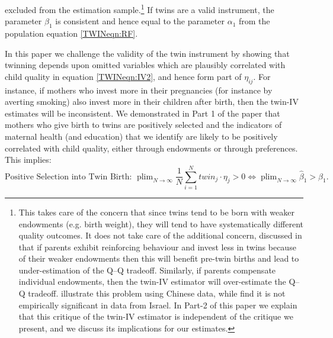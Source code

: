 \documentclass[subeqn]{article}
\DeclareMathOperator{\plim}{plim}
\begin{document}
\begin{spacing}{1.4}
excluded from the estimation sample.\footnote{This takes care of the concern that since twins tend to be born with weaker endowments (e.g. birth weight),
  they will tend to have systematically different quality outcomes. It does not take care of the additional concern, discussed in \citet{RosenzweigZhang2009} that if parents exhibit reinforcing behaviour and invest less in twins because of their weaker endowments then this will benefit pre-twin births and lead to under-estimation of the Q--Q tradeoff. Similarly, if parents compensate individual endowments, then the twin-IV estimator will over-estimate the Q--Q tradeoff. \citet{RosenzweigZhang2009} illustrate this problem using Chinese data, while \citet{Angristetal2010} find it is not empirically significant in data from Israel. In Part-2 of this paper we explain that this critique of the twin-IV estimator is independent of the critique we present, and we discuss its implications for our estimates.} %
If twins are a valid instrument, the parameter $\beta_1$ is consistent and hence
equal to the parameter $\alpha_1$ from the population equation \ref{TWINeqn:RF}.

In this paper we challenge the validity of the twin instrument by showing that twinning depends upon omitted variables which are plausibly correlated with child quality
in equation \ref{TWINeqn:IV2}, and hence form part of $\eta_{ij}$.  
For instance, if mothers who invest more in their pregnancies (for instance by averting smoking) also 
invest more in their children after birth, then the twin-IV estimates will be inconsistent. 
We demonstrated in Part 1 of the paper that mothers who give birth to twins are positively selected and the indicators of maternal health (and education) that we identify are likely to be positively correlated with child quality, either through endowments or through preferences. This implies:
\begin{equation}
  \text{Positive Selection into Twin Birth:\ \ \ }  \plim_{N\rightarrow\infty} \frac{1}{N}\sum_{i=1}^Ntwin_j\cdot \eta_j > 0 \Leftrightarrow \plim_{N\rightarrow\infty}\hat\beta_1 > \beta_1. \nonumber
\end{equation}


\end{spacing}
\end{document}

